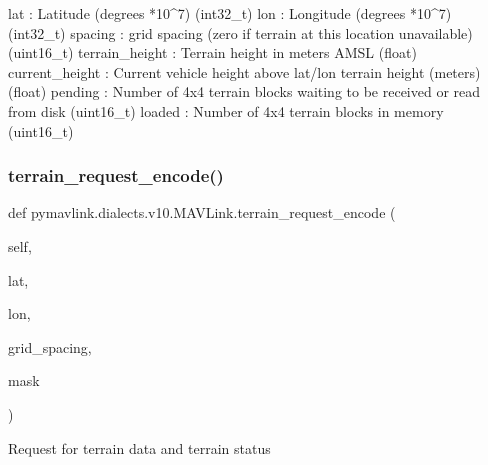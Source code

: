\begin{DoxyVerb}
\begin{DoxyVerb}
\begin{DoxyVerb}
\begin{DoxyVerb}
\begin{DoxyVerb}
\begin{DoxyVerb}
\begin{DoxyVerb}
\begin{DoxyVerb}
\begin{DoxyVerb}
\begin{DoxyVerb}
\begin{DoxyVerb}
lat                       : Latitude (degrees *10^7) (int32_t)
lon                       : Longitude (degrees *10^7) (int32_t)
spacing                   : grid spacing (zero if terrain at this location unavailable) (uint16_t)
terrain_height            : Terrain height in meters AMSL (float)
current_height            : Current vehicle height above lat/lon terrain height (meters) (float)
pending                   : Number of 4x4 terrain blocks waiting to be received or read from disk (uint16_t)
loaded                    : Number of 4x4 terrain blocks in memory (uint16_t)\end{DoxyVerb}
 \mbox{\label{classpymavlink_1_1dialects_1_1v10_1_1MAVLink_af9baf8ee9391ad618e72ff17912f824a}} 
\subsubsection{\texorpdfstring{terrain\+\_\+request\+\_\+encode()}{terrain\_request\_encode()}}
{\footnotesize\ttfamily def pymavlink.\+dialects.\+v10.\+M\+A\+V\+Link.\+terrain\+\_\+request\+\_\+encode (\begin{DoxyParamCaption}\item[{}]{self,  }\item[{}]{lat,  }\item[{}]{lon,  }\item[{}]{grid\+\_\+spacing,  }\item[{}]{mask }\end{DoxyParamCaption})}

\begin{DoxyVerb}Request for terrain data and terrain status


\end{DoxyVerb}
\end{DoxyVerb}
\end{DoxyVerb}
\end{DoxyVerb}
\end{DoxyVerb}
\end{DoxyVerb}
\end{DoxyVerb}
\end{DoxyVerb}
\end{DoxyVerb}
\end{DoxyVerb}
\end{DoxyVerb}
